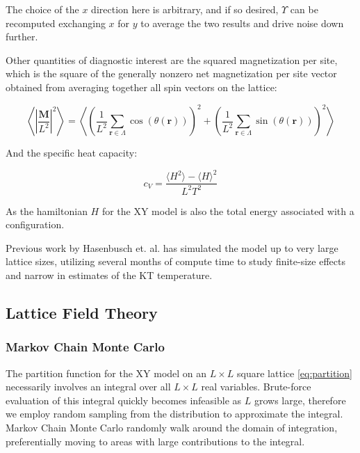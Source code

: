 \documentclass[12pt]{article}
\begin{document}
The choice of the $x$ direction here is arbitrary, and if so desired, $\Upsilon$ can be recomputed exchanging $x$ for $y$ to average the two results
and drive noise down further.

Other quantities of diagnostic interest are the squared magnetization per site, which is the square of the generally
nonzero net magnetization per site vector obtained from averaging together all spin vectors on the lattice:

\begin{equation}
	\left\langle \left|\frac{\mathbf{M}}{L^2}\right|^2 \right\rangle = \left\langle \left( \frac{1}{L^2}\sum_{\mathbf{r}\in\Lambda} \cos(\theta(\mathbf{r})) \right)^2 + \left( \frac{1}{L^2}\sum_{\mathbf{r}\in\Lambda} \sin(\theta(\mathbf{r})) \right)^2 \right\rangle
\end{equation}

And the specific heat capacity:

\begin{equation}
	c_V = \frac{\langle H^2 \rangle - \langle H \rangle^2}{L^2 T^2}
\end{equation}

As the hamiltonian $H$ for the XY model is also the total energy associated with a configuration.

Previous work by Hasenbusch et. al. \cite{Hasenbusch_2005} has simulated the model up to very large lattice sizes, utilizing several months of compute
time to study finite-size effects and narrow in estimates of the KT temperature. 

\subsection{Lattice Field Theory}

\subsubsection{Markov Chain Monte Carlo}

The partition function for the XY model on an $L\times L$ square lattice \ref{eq:partition} necessarily involves an integral over all $L\times L$ real variables.
Brute-force evaluation of this integral quickly becomes infeasible as $L$ grows large, therefore we employ random sampling from the distribution to approximate
the integral. Markov Chain Monte Carlo randomly walk around the domain of integration, preferentially moving to areas with large contributions to the integral.
\end{document}
